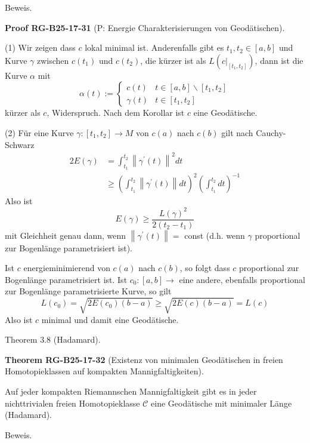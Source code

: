 \documentclass[10pt, letterpaper]{article}
\newcommand{\CustomHeading}[3]{%
  \par\medskip\noindent%
  \textbf{#1 #2} \textnormal{(#3)}.\enskip%
}
\newenvironment{THEO}[2]{\begin{unitbox}\CustomHeading{Theorem}{#1}{#2}}{\end{unitbox}}
\newenvironment{PROOF}[2]{\begin{unitbox}\CustomHeading{Proof}{#1}{#2}}{\end{unitbox}}
\begin{document}
Beweis. 


\begin{PROOF}{RG-B25-17-31}{P: Energie Charakterisierungen von Geodätischen}
(1) Wir zeigen dass $c$ lokal minimal ist. Anderenfalls gibt es $t_{1}, t_{2} \in[a, b]$ und Kurve $\gamma$ zwischen $c\left(t_{1}\right)$ und $c\left(t_{2}\right)$, die kürzer ist als $L\left(\left.c\right|_{\left[t_{1}, t_{2}\right]}\right)$, dann ist die Kurve $\alpha$ mit
$$
\alpha(t):=\left\{\begin{array}{cc}
c(t) & t \in[a, b] \backslash\left[t_{1}, t_{2}\right] \\
\gamma(t) & t \in\left[t_{1}, t_{2}\right]
\end{array}\right.
$$
kürzer als $c$, Widerspruch. Nach dem Korollar ist $c$ eine Geodätische.

(2) Für eine Kurve $\gamma:\left[t_{1}, t_{2}\right] \rightarrow M$ von $c(a)$ nach $c(b)$ gilt nach Cauchy-Schwarz
$$
\begin{aligned}
2 E(\gamma) & =\int_{t_{1}}^{t_{2}}\left\|\gamma^{\prime}(t)\right\|^{2} d t \\
& \geq\left(\int_{t_{1}}^{t_{2}}\left\|\gamma^{\prime}(t)\right\| d t\right)^{2}\left(\int_{t_{1}}^{t_{2}} d t\right)^{-1}
\end{aligned}
$$
Also ist
$$
E(\gamma) \geq \frac{L(\gamma)^{2}}{2\left(t_{2}-t_{1}\right)}
$$
mit Gleichheit genau dann, wenn $\left\|\gamma^{\prime}(t)\right\|=$ const (d.h. wenn $\gamma$ proportional zur Bogenlänge parametrisiert ist).

Ist $c$ energieminimierend von $c(a)$ nach $c(b)$, so folgt dass $c$ proportional zur Bogenlänge parametrisiert ist. Ist $c_{0}:[a, b] \rightarrow$ eine andere, ebenfalls proportional zur Bogenlänge parametrisierte Kurve, so gilt
$$
L\left(c_{0}\right)=\sqrt{2 E\left(c_{0}\right)(b-a)} \geq \sqrt{2 E(c)(b-a)}=L(c)
$$
Also ist $c$ minimal und damit eine Geodätische.
\end{PROOF}




Theorem 3.8 (Hadamard). 

\begin{THEO}{RG-B25-17-32}{Existenz von minimalen Geodätischen in freien Homotopieklassen auf kompakten Mannigfaltigkeiten}
Auf jeder kompakten Riemannschen Mannigfaltigkeit gibt es in jeder nichttrivialen freien Homotopieklasse $\mathcal{C}$ eine Geodätische mit minimaler Länge (Hadamard).
\end{THEO}


Beweis. 
\end{document}
